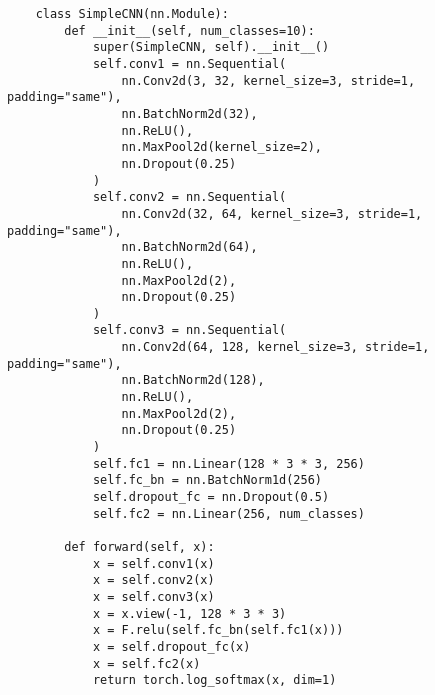 \begin{verbatim}
    class SimpleCNN(nn.Module):
        def __init__(self, num_classes=10):
            super(SimpleCNN, self).__init__()
            self.conv1 = nn.Sequential(
                nn.Conv2d(3, 32, kernel_size=3, stride=1, padding="same"),
                nn.BatchNorm2d(32),
                nn.ReLU(),
                nn.MaxPool2d(kernel_size=2),
                nn.Dropout(0.25)
            )
            self.conv2 = nn.Sequential(
                nn.Conv2d(32, 64, kernel_size=3, stride=1, padding="same"),
                nn.BatchNorm2d(64),            
                nn.ReLU(),
                nn.MaxPool2d(2),
                nn.Dropout(0.25)
            )
            self.conv3 = nn.Sequential(
                nn.Conv2d(64, 128, kernel_size=3, stride=1, padding="same"),
                nn.BatchNorm2d(128),
                nn.ReLU(),
                nn.MaxPool2d(2),
                nn.Dropout(0.25)
            )
            self.fc1 = nn.Linear(128 * 3 * 3, 256)
            self.fc_bn = nn.BatchNorm1d(256)
            self.dropout_fc = nn.Dropout(0.5)
            self.fc2 = nn.Linear(256, num_classes)
        
        def forward(self, x):
            x = self.conv1(x)
            x = self.conv2(x)
            x = self.conv3(x)
            x = x.view(-1, 128 * 3 * 3)
            x = F.relu(self.fc_bn(self.fc1(x)))
            x = self.dropout_fc(x)
            x = self.fc2(x)
            return torch.log_softmax(x, dim=1)
\end{verbatim}
    